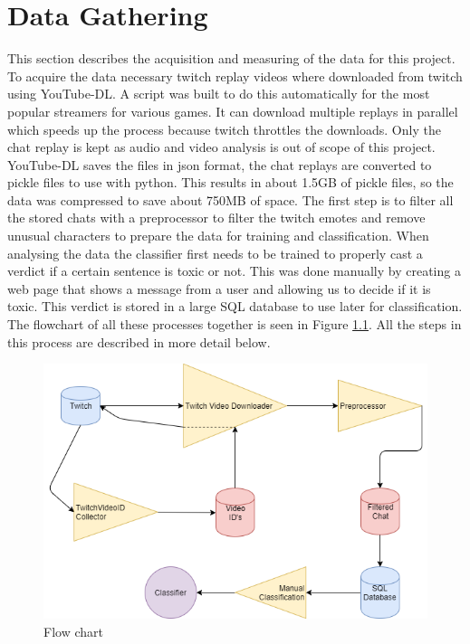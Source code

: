 \documentclass[final]{report}
\begin{document}
\chapter{Data Gathering}
\label{ch:datagathering}

This section describes the acquisition and measuring of the data for this project.
To acquire the data necessary twitch replay videos where downloaded from twitch using YouTube-DL.
A script was built to do this automatically for the most popular streamers for various games. 
It can download multiple replays in parallel which speeds up the process because twitch throttles the downloads.
Only the chat replay is kept as audio and video analysis is out of scope of this project.
YouTube-DL saves the files in json format, the chat replays are converted to pickle files to use with python. 
This results in about 1.5GB of pickle files, so the data was compressed to save about 750MB of space.
The first step is to filter all the stored chats with a preprocessor to filter the twitch emotes and remove unusual characters to prepare the data for training and classification.
When analysing the data the classifier first needs to be trained to properly cast a verdict if a certain sentence is toxic or not.
This was done manually by creating a web page that shows a message from a user and allowing us to decide if it is toxic. This verdict is stored in a large SQL database to use later for classification. 
The flowchart of all these processes together is seen in Figure \ref{fig:flowchart}. All the steps in this process are described in more detail below.


\begin{figure}[h]
	\includegraphics[width=\textwidth]{FlowChart.png}
	\caption{Flow chart}
	\label{fig:flowchart}
\end{figure}
\end{document}
